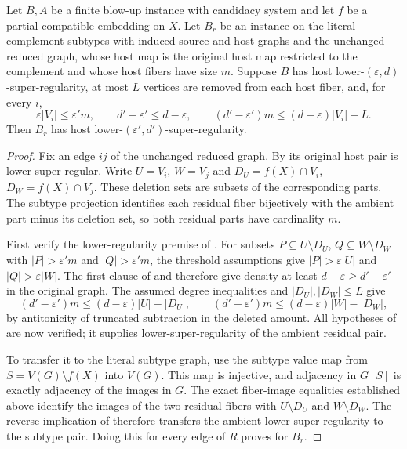 \begin{lemma}
Let $B,A$ be a finite blow-up instance with candidacy system and let $f$
be a partial compatible embedding on $X$. Let $B_r$ be an instance on
the literal complement subtypes with induced source and host graphs and
the unchanged reduced graph, whose host map is the original host map
restricted to the complement and whose host fibers have size $m$.
Suppose $B$ has host lower-$(\varepsilon,d)$-super-regularity, at most $L$
vertices are removed from each host fiber, and, for every $i$,
\[
 \varepsilon|V_i|\leq\varepsilon'm,\qquad
 d'-\varepsilon'\leq d-\varepsilon,\qquad
 (d'-\varepsilon')m\leq(d-\varepsilon)|V_i|-L.
\]
Then $B_r$ has host lower-$(\varepsilon',d')$-super-regularity.
\end{lemma}
\begin{proof}
Fix an edge $ij$ of the unchanged reduced graph. By
 its original host pair is
lower-super-regular. Write $U=V_i$, $W=V_j$ and
$D_U=f(X)\cap V_i$, $D_W=f(X)\cap V_j$.
These deletion sets are subsets of the corresponding parts.
The subtype projection identifies each residual fiber bijectively with
the ambient part minus its deletion set, so both residual parts have
cardinality $m$.

First verify the lower-regularity premise of
. For subsets
$P\subseteq U\setminus D_U$, $Q\subseteq W\setminus D_W$ with
$|P|>\varepsilon'm$ and $|Q|>\varepsilon'm$, the threshold assumptions
give $|P|>\varepsilon|U|$ and $|Q|>\varepsilon|W|$.
The first clause of  and
 therefore give density at least
$d-\varepsilon\geq d'-\varepsilon'$ in the original graph.
The assumed degree inequalities and $|D_U|,|D_W|\leq L$ give
\[
 (d'-\varepsilon')m\leq(d-\varepsilon)|U|-|D_U|,
 \qquad (d'-\varepsilon')m\leq(d-\varepsilon)|W|-|D_W|,
\]
by antitonicity of truncated subtraction in the deleted amount.
All hypotheses of  are now
verified; it supplies lower-super-regularity of the ambient residual pair.

To transfer it to the literal subtype graph, use the subtype value map
from $S=V(G)\setminus f(X)$ into $V(G)$. This map is injective, and
adjacency in $G[S]$ is exactly adjacency of the images in $G$.
The exact fiber-image equalities established above identify the images
of the two residual fibers with $U\setminus D_U$ and $W\setminus D_W$.
The reverse implication of 
therefore transfers the ambient lower-super-regularity to the subtype
pair. Doing this for every edge of $R$ proves
 for $B_r$.
\end{proof}
